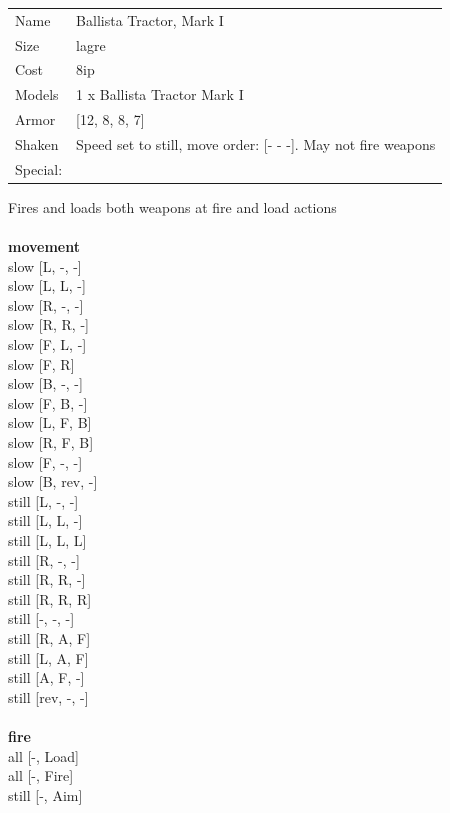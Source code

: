 \begin{tabular}{ll}
  Name & Ballista Tractor, Mark I \\
  Size & lagre\\
  Cost & 8ip\\
  Models & 1 x Ballista Tractor Mark I\\
  Armor & [12, 8, 8, 7]\\
  Shaken & Speed set to still, move order: [- - -]. May not fire weapons\\
  Special: \\
\end{tabular}

\noindent Fires and loads both weapons at fire and load actions\\ 


\ \\ {\bf movement } \\
slow [L, -, -] \\
slow [L, L, -] \\
slow [R, -, -] \\
slow [R, R, -] \\
slow [F, L, -] \\
slow [F, R] \\
slow [B, -, -] \\
slow [F, B, -] \\
slow [L, F, B] \\
slow [R, F, B] \\
slow [F, -, -] \\
slow [B, rev, -] \\
still [L, -, -] \\
still [L, L, -] \\
still [L, L, L] \\
still [R, -, -] \\
still [R, R, -] \\
still [R, R, R] \\
still [-, -, -] \\
still [R, A, F] \\
still [L, A, F] \\
still [A, F, -] \\
still [rev, -, -] \\
\ \\ {\bf fire } \\
all [-, Load] \\
all [-, Fire] \\
still [-, Aim] \\


